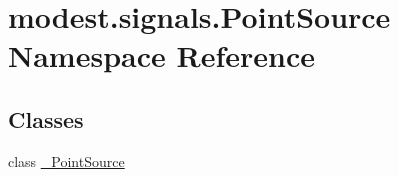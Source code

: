 \hypertarget{namespacemodest_1_1signals_1_1PointSource}{}\section{modest.\+signals.\+Point\+Source Namespace Reference}
\label{namespacemodest_1_1signals_1_1PointSource}
\subsection*{Classes}
\begin{DoxyCompactItemize}
\item 
class \hyperlink{classmodest_1_1signals_1_1PointSource_1_1__PointSource}{\+\_\+\+Point\+Source}
\end{DoxyCompactItemize}
